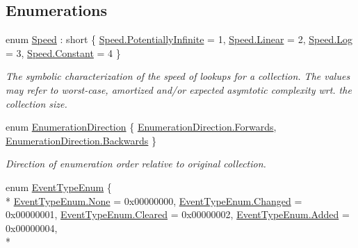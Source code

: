 \subsection*{Enumerations}
\begin{DoxyCompactItemize}
\item 
enum \hyperlink{namespace_c5_a615ba88dcdaa8d5a3c5f833a73d7fad6}{Speed} \+: short \{ \hyperlink{namespace_c5_a615ba88dcdaa8d5a3c5f833a73d7fad6a80e9b5be5249c2c27eba9e624804727b}{Speed.\+Potentially\+Infinite} = 1, 
\hyperlink{namespace_c5_a615ba88dcdaa8d5a3c5f833a73d7fad6a32a843da6ea40ab3b17a3421ccdf671b}{Speed.\+Linear} = 2, 
\hyperlink{namespace_c5_a615ba88dcdaa8d5a3c5f833a73d7fad6ace0be71e33226e4c1db2bcea5959f16b}{Speed.\+Log} = 3, 
\hyperlink{namespace_c5_a615ba88dcdaa8d5a3c5f833a73d7fad6acb17869fe51048b5a5c4c6106551a255}{Speed.\+Constant} = 4
 \}\begin{DoxyCompactList}\small\item\em The symbolic characterization of the speed of lookups for a collection. The values may refer to worst-\/case, amortized and/or expected asymtotic complexity wrt. the collection size. \end{DoxyCompactList}
\item 
enum \hyperlink{namespace_c5_aad282676794e49130eb8caed289395f8}{Enumeration\+Direction} \{ \hyperlink{namespace_c5_aad282676794e49130eb8caed289395f8a1e411b48c18c85a91ad46b53ebb24d6a}{Enumeration\+Direction.\+Forwards}, 
\hyperlink{namespace_c5_aad282676794e49130eb8caed289395f8a9d1104e419414f4c268be7211fb8fc4a}{Enumeration\+Direction.\+Backwards}
 \}\begin{DoxyCompactList}\small\item\em Direction of enumeration order relative to original collection. \end{DoxyCompactList}
\item 
enum \hyperlink{namespace_c5_a9143bfd561fffa025d21561674758008}{Event\+Type\+Enum} \{ \\*
\hyperlink{namespace_c5_a9143bfd561fffa025d21561674758008a6adf97f83acf6453d4a6a4b1070f3754}{Event\+Type\+Enum.\+None} = 0x00000000, 
\hyperlink{namespace_c5_a9143bfd561fffa025d21561674758008a820dbd2b8f606aff866c0bbfb6b737c1}{Event\+Type\+Enum.\+Changed} = 0x00000001, 
\hyperlink{namespace_c5_a9143bfd561fffa025d21561674758008aa3b087a75730395ff9ff9d3dd307295e}{Event\+Type\+Enum.\+Cleared} = 0x00000002, 
\hyperlink{namespace_c5_a9143bfd561fffa025d21561674758008af29ddbfb905eb2593fdcdfb243f9af85}{Event\+Type\+Enum.\+Added} = 0x00000004, 
\\*

\end{DoxyCompactItemize}
